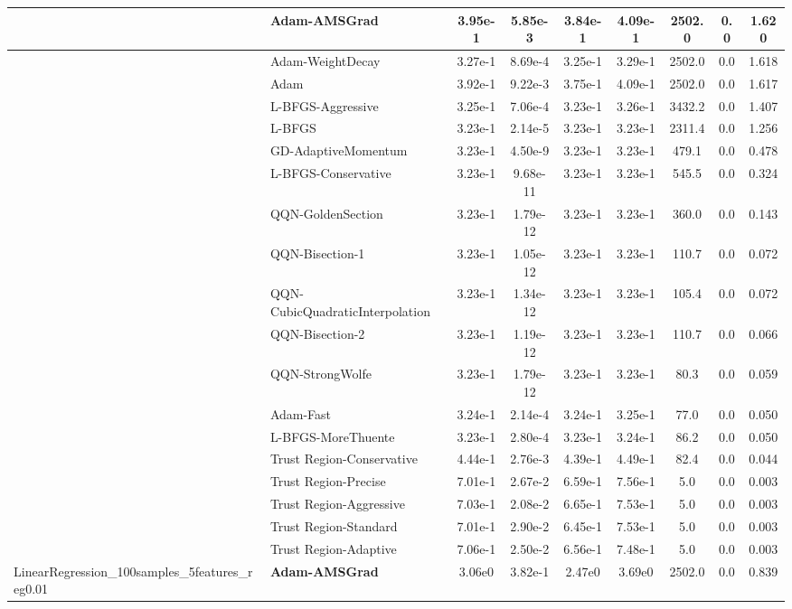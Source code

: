 \documentclass{article}
\begin{document}
\begin{longtable}{|l|l|c|c|c|c|c|c|c|}
\hline
 & Adam-AMSGrad & 3.95e-1 & 5.85e-3 & 3.84e-1 & 4.09e-1 & 2502.0 & 0.0 & 1.620 \\
\hline
 & Adam-WeightDecay & 3.27e-1 & 8.69e-4 & 3.25e-1 & 3.29e-1 & 2502.0 & 0.0 & 1.618 \\
\hline
 & Adam & 3.92e-1 & 9.22e-3 & 3.75e-1 & 4.09e-1 & 2502.0 & 0.0 & 1.617 \\
\hline
 & L-BFGS-Aggressive & 3.25e-1 & 7.06e-4 & 3.23e-1 & 3.26e-1 & 3432.2 & 0.0 & 1.407 \\
\hline
 & L-BFGS & 3.23e-1 & 2.14e-5 & 3.23e-1 & 3.23e-1 & 2311.4 & 0.0 & 1.256 \\
\hline
 & GD-AdaptiveMomentum & 3.23e-1 & 4.50e-9 & 3.23e-1 & 3.23e-1 & 479.1 & 0.0 & 0.478 \\
\hline
 & L-BFGS-Conservative & 3.23e-1 & 9.68e-11 & 3.23e-1 & 3.23e-1 & 545.5 & 0.0 & 0.324 \\
\hline
 & QQN-GoldenSection & 3.23e-1 & 1.79e-12 & 3.23e-1 & 3.23e-1 & 360.0 & 0.0 & 0.143 \\
\hline
 & QQN-Bisection-1 & 3.23e-1 & 1.05e-12 & 3.23e-1 & 3.23e-1 & 110.7 & 0.0 & 0.072 \\
\hline
 & QQN-CubicQuadraticInterpolation & 3.23e-1 & 1.34e-12 & 3.23e-1 & 3.23e-1 & 105.4 & 0.0 & 0.072 \\
\hline
 & QQN-Bisection-2 & 3.23e-1 & 1.19e-12 & 3.23e-1 & 3.23e-1 & 110.7 & 0.0 & 0.066 \\
\hline
 & QQN-StrongWolfe & 3.23e-1 & 1.79e-12 & 3.23e-1 & 3.23e-1 & 80.3 & 0.0 & 0.059 \\
\hline
 & Adam-Fast & 3.24e-1 & 2.14e-4 & 3.24e-1 & 3.25e-1 & 77.0 & 0.0 & 0.050 \\
\hline
 & L-BFGS-MoreThuente & 3.23e-1 & 2.80e-4 & 3.23e-1 & 3.24e-1 & 86.2 & 0.0 & 0.050 \\
\hline
 & Trust Region-Conservative & 4.44e-1 & 2.76e-3 & 4.39e-1 & 4.49e-1 & 82.4 & 0.0 & 0.044 \\
\hline
 & Trust Region-Precise & 7.01e-1 & 2.67e-2 & 6.59e-1 & 7.56e-1 & 5.0 & 0.0 & 0.003 \\
\hline
 & Trust Region-Aggressive & 7.03e-1 & 2.08e-2 & 6.65e-1 & 7.53e-1 & 5.0 & 0.0 & 0.003 \\
\hline
 & Trust Region-Standard & 7.01e-1 & 2.90e-2 & 6.45e-1 & 7.53e-1 & 5.0 & 0.0 & 0.003 \\
\hline
 & Trust Region-Adaptive & 7.06e-1 & 2.50e-2 & 6.56e-1 & 7.48e-1 & 5.0 & 0.0 & 0.003 \\
LinearRegression\_100samples\_5features\_reg0.01 & \textbf{Adam-AMSGrad} & 3.06e0 & 3.82e-1 & 2.47e0 & 3.69e0 & 2502.0 & 0.0 & 0.839 \\

\end{longtable}
\end{document}
